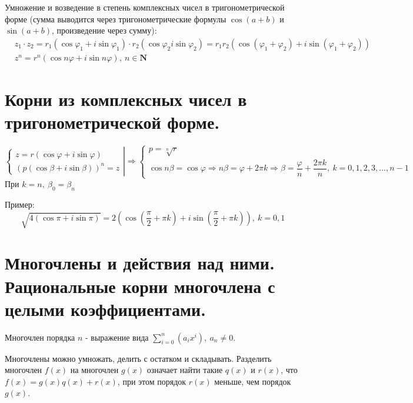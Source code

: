 \documentclass[12pt]{article}
\begin{document}
\begin{sloppypar}
    Умножение и возведение в степень комплексных чисел в тригонометрической форме (сумма выводится через тригонометрические формулы $\cos(a + b)$ и $\sin(a + b)$, произведение через сумму):
    \begin{align*}
         & z_1 \cdot z_2 = r_1(\cos \varphi_1 + i \sin \varphi_1) \cdot r_2(\cos \varphi_2 i \sin \varphi_2) = r_1r_2(\cos(\varphi_1 + \varphi_2) + i \sin(\varphi_1 + \varphi_2)) \\
         & z^n = r^n(\cos n\varphi + i \sin n\varphi),\ n \in \mathbf{N}
    \end{align*}

    \section{Корни из комплексных чисел в тригонометрической форме.}
    \[
        \left.\begin{cases}
            z = r(\cos \varphi + i \sin \varphi) \\
            (p(\cos \beta + i \sin \beta))^n = z
        \end{cases}\right|
        \Rightarrow
        \begin{cases}
            p = \sqrt[n]{r} \\
            \cos n\beta = \cos \varphi \Rightarrow n\beta = \varphi + 2\pi k \Rightarrow \beta = \dfrac{\varphi}{n} + \dfrac{2\pi k}{n}, \ k=0, 1, 2, 3, ..., n-1
        \end{cases}
    \]
    При $k = n, \ \beta_0 = \beta_n$

    Пример:
    \[
        \sqrt{4(\cos \pi + i \sin \pi)} = 2(\cos{(\dfrac{\pi}{2} + \pi k)} + i\sin{(\dfrac{\pi}{2} + \pi k)}), \  k = 0, 1
    \]

    \section{Многочлены и действия над ними. Рациональные корни многочлена с целыми коэффициентами.}
    Многочлен порядка $n$ - выражение вида $\sum^n_{i = 0}(a_i x^i),\ a_n \neq 0$.

    Многочлены можно умножать, делить с остатком и складывать.
    Разделить многочлен $f(x)$ на многочлен $g(x)$ означает найти такие $q(x)$ и $r(x)$, что $f(x) = g(x)q(x) + r(x)$, при этом порядок $r(x)$ меньше, чем порядок $g(x)$.


\end{sloppypar}
\end{document}

